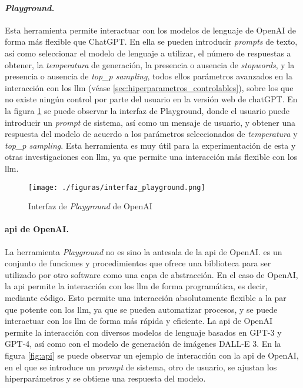     \paragraph{\emph{Playground.}} Esta herramienta permite interactuar con los modelos de lenguaje de OpenAI de forma más flexible que ChatGPT. En ella se pueden introducir \emph{prompts} de texto, así como seleccionar el modelo de lenguaje a utilizar, el número de respuestas a obtener, la \emph{temperatura} de generación, la presencia o ausencia de \emph{stopwords}, y la presencia o ausencia de \emph{top\_p sampling}, todos ellos parámetros avanzados en la interacción con los \gls{llm} (véase \ref{sec:hiperparametros_controlables}), sobre los que no existe ningún control por parte del usuario en la versión web de chatGPT. En la figura \ref{fig:playground} se puede observar la interfaz de Playground, donde el usuario puede introducir un \emph{prompt} de sistema, así como un mensaje de usuario, y obtener una respuesta del modelo de acuerdo a los parámetros seleccionados de \emph{temperatura} y \emph{top\_p sampling}. Esta herramienta es muy útil para la experimentación de esta y otras investigaciones con \gls{llm}, ya que permite una interacción más flexible con los \gls{llm}.

    \begin{figure}[h]
        \caption[Interfaz de \emph{Playground} de OpenAI]{Interfaz de \emph{Playground} de OpenAI}
        \centering
        \texttt{[image: ./figuras/interfaz\_playground.png]}
        \source{\propio}
        \label{fig:playground}
    \end{figure}

    \paragraph{\gls{api} de OpenAI.} La herramienta \emph{Playground} no es sino la antesala de la \gls{api} de OpenAI.  es un conjunto de funciones y procedimientos que ofrece una biblioteca para ser utilizado por otro software como una capa de abstracción. En el caso de OpenAI, la \gls{api} permite la interacción con los \gls{llm} de forma programática, es decir, mediante código. Esto permite una interacción absolutamente flexible a la par que potente con los \gls{llm}, ya que se pueden automatizar procesos, y se puede interactuar con los \gls{llm} de forma más rápida y eficiente. La \gls{api} de OpenAI permite la interacción con diversos modelos de lenguaje basados en GPT-3 y GPT-4, así como con el modelo de generación de imágenes DALL-E 3. En la figura \ref{fig:api} se puede observar un ejemplo de interacción con la \gls{api} de OpenAI, en el que se introduce un \emph{prompt} de sistema, otro de usuario, se ajustan los hiperparámetros y se obtiene una respuesta del modelo.

